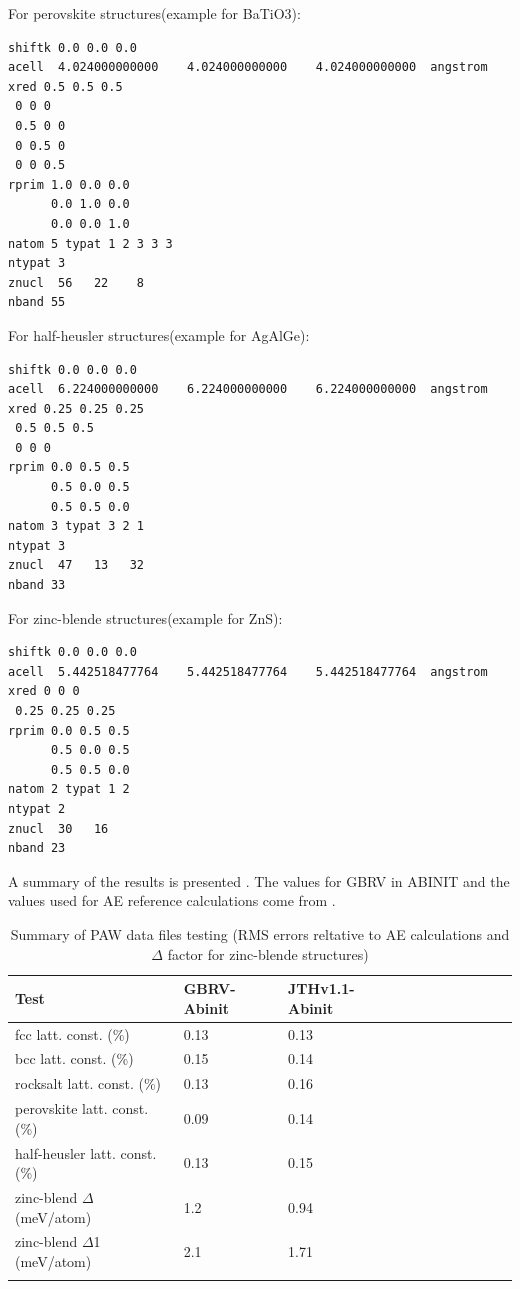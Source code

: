 \documentclass[10pt]{revtex4}
\begin{document}
For perovskite structures(example for BaTiO3):\\
\begin{verbatim}
shiftk 0.0 0.0 0.0
acell  4.024000000000    4.024000000000    4.024000000000  angstrom
xred 0.5 0.5 0.5
 0 0 0
 0.5 0 0
 0 0.5 0
 0 0 0.5
rprim 1.0 0.0 0.0
      0.0 1.0 0.0
      0.0 0.0 1.0
natom 5 typat 1 2 3 3 3
ntypat 3
znucl  56   22    8
nband 55
\end{verbatim}

For half-heusler structures(example for AgAlGe):\\
\begin{verbatim}
shiftk 0.0 0.0 0.0
acell  6.224000000000    6.224000000000    6.224000000000  angstrom
xred 0.25 0.25 0.25
 0.5 0.5 0.5
 0 0 0
rprim 0.0 0.5 0.5
      0.5 0.0 0.5
      0.5 0.5 0.0
natom 3 typat 3 2 1
ntypat 3
znucl  47   13   32
nband 33
\end{verbatim}

For zinc-blende structures(example for ZnS):\\
\begin{verbatim}
shiftk 0.0 0.0 0.0
acell  5.442518477764    5.442518477764    5.442518477764  angstrom
xred 0 0 0
 0.25 0.25 0.25
rprim 0.0 0.5 0.5
      0.5 0.0 0.5
      0.5 0.5 0.0
natom 2 typat 1 2
ntypat 2
znucl  30   16
nband 23
\end{verbatim}



A summary of the results is presented \label{tab1}. The values for GBRV in ABINIT and the values used for AE reference calculations come from \cite{web5}.  


\begin{table}[H]
\begin{center}
\begin{tabular}{llllllllccc}
\\\hline
 Test& GBRV-Abinit & JTHv1.1-Abinit \\
\hline
 fcc latt. const. (\%)   &  0.13  &  0.13  \\
 bcc  latt. const. (\%)  & 0.15   & 0.14  \\
 rocksalt  latt. const. (\%)  & 0.13   & 0.16  \\
 perovskite  latt. const. (\%)  & 0.09   & 0.14  \\
 half-heusler  latt. const. (\%)  & 0.13   & 0.15  \\
 zinc-blend $\Delta$ (meV/atom)  & 1.2   & 0.94  \\
 zinc-blend $\Delta$1 (meV/atom)  & 2.1   & 1.71  \\

\\\hline
\end{tabular}
\caption{Summary of PAW data files testing (RMS errors reltative to AE calculations and $\Delta$ factor for zinc-blende structures)  }
\label{tab1}
\end{center}
\end{table}
\end{document}
